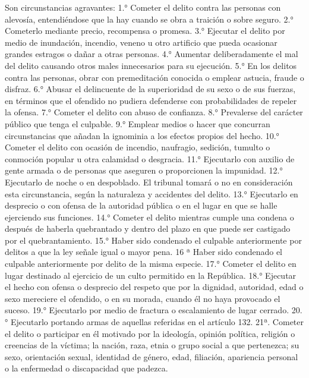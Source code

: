     Son circunstancias agravantes:
    1.° Cometer el delito contra las personas con alevosía, entendiéndose que la hay cuando se obra a traición o sobre seguro.
    2.° Cometerlo mediante precio, recompensa o promesa.
    3.° Ejecutar el delito por medio de inundación, incendio, veneno u otro artificio que pueda ocasionar grandes estragos o dañar a otras personas.
    4.° Aumentar deliberadamente el mal del delito causando otros males innecesarios para su ejecución.
    5.° En los delitos contra las personas, obrar con premeditación conocida o emplear astucia, fraude o disfraz.
    6.° Abusar el delincuente de la superioridad de su sexo o de sus fuerzas, en términos que el ofendido no pudiera defenderse con probabilidades de repeler la ofensa.
    7.° Cometer el delito con abuso de confianza.
    8.° Prevalerse del carácter público que tenga el culpable.
    9.° Emplear medios o hacer que concurran circunstancias que añadan la ignominia a los efectos propios del hecho.
    10.° Cometer el delito con ocasión de incendio, naufragio, sedición, tumulto o conmoción popular u otra calamidad o desgracia.
    11.° Ejecutarlo con auxilio de gente armada o de personas que aseguren o proporcionen la impunidad.
    12.° Ejecutarlo de noche o en despoblado.
    El tribunal tomará o no en consideración esta circunstancia, según la naturaleza y accidentes del delito.
    13.° Ejecutarlo en desprecio o con ofensa de la autoridad pública o en el lugar en que se halle ejerciendo sus funciones.
    14.° Cometer el delito mientras cumple una condena o después de haberla quebrantado y dentro del plazo en que puede ser castigado por el quebrantamiento.
    15.° Haber sido condenado el culpable anteriormente por delitos a que la ley señale igual o mayor pena.
    16 ª Haber sido condenado el culpable anteriormente por delito de la misma especie.
    17.° Cometer el delito en lugar destinado al ejercicio de un culto permitido en la República.
    18.° Ejecutar el hecho con ofensa o desprecio del respeto que por la dignidad, autoridad, edad o sexo mereciere el ofendido, o en su morada, cuando él no haya provocado el suceso.
    19.° Ejecutarlo por medio de fractura o escalamiento de lugar cerrado.
    20.° Ejecutarlo portando armas de aquellas referidas en el artículo 132.
    21ª. Cometer el delito o participar en él motivado por la ideología, opinión política, religión o creencias de la víctima; la nación, raza, etnia o grupo social a que pertenezca; su sexo, orientación sexual, identidad de género, edad, filiación, apariencia personal o la enfermedad o discapacidad que padezca.




